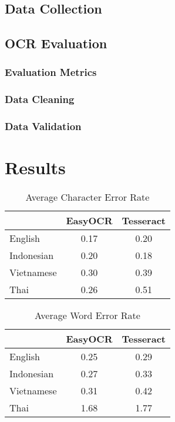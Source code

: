 \documentclass[12pt,oneside]{memoir}
\begin{document}
\section{Data Collection}

\section{OCR Evaluation}

\subsection{Evaluation Metrics}

\subsection{Data Cleaning}

\subsection{Data Validation}

\chapter{Results}

\begin{table}[h]
    \centering
    \begin{tabular}{lcc}
        \toprule
        & EasyOCR & Tesseract \\
        \midrule
        English & 0.17 & 0.20\\
        Indonesian & 0.20 & 0.18\\
        Vietnamese & 0.30 & 0.39\\
        Thai & 0.26 & 0.51\\
        \bottomrule
    \end{tabular}
    \caption{Average Character Error Rate}
\end{table}

\begin{table}[h]
    \centering
    \begin{tabular}{lcc}
        \toprule
        
        & EasyOCR & Tesseract \\
        \midrule
        English & 0.25 & 0.29\\
        Indonesian & 0.27 & 0.33\\
        Vietnamese & 0.31 & 0.42\\
        Thai & 1.68 & 1.77\\
        \bottomrule
    \end{tabular}
    \caption{Average Word Error Rate}
\end{table}
\end{document}
